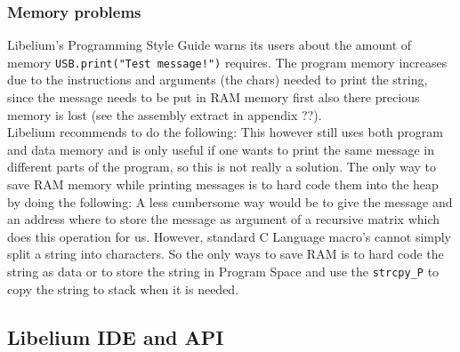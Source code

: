 \subsubsection{Memory problems}
Libelium's Programming Style Guide warns its users about the amount of memory \verb+USB.print("Test message!")+ requires. The program memory increases due to the instructions and arguments (the chars) needed to print the string, since the message needs to be put in RAM memory first also there precious memory is lost (see the assembly extract in appendix ??).\\
Libelium recommends to do the following:
This however still uses both program and data memory and is only useful if one wants to print the same message in different parts of the program, so this is not really a solution. The only way to save RAM memory while printing messages is to hard code them into the heap by doing the following:
A less cumbersome way would be to give the message and an address where to store the message as argument of a recursive matrix which does this operation for us. However, standard C Language macro's cannot simply split a string into characters. So the only ways to save RAM is to hard code the string as data or to store the string in Program Space and use the \verb+strcpy_P+ to copy the string to stack when it is needed. 
\subsection{Libelium IDE and API}
